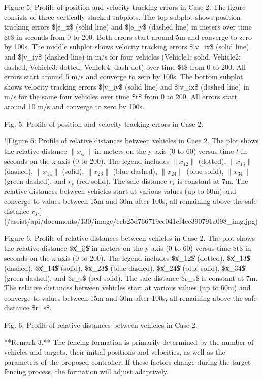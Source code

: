 Figure 5: Profile of position and velocity tracking errors in Case 2. The figure consists of three vertically stacked subplots. The top subplot shows position tracking errors \$\bar{e}\_x\$ (solid line) and \$\bar{e}\_y\$ (dashed line) in meters over time \$t\$ in seconds from 0 to 200. Both errors start around 5m and converge to zero by 100s. The middle subplot shows velocity tracking errors \$\bar{v}\_{ix}\$ (solid line) and \$\bar{v}\_{iy}\$ (dashed line) in m/s for four vehicles (Vehicle1: solid, Vehicle2: dashed, Vehicle3: dotted, Vehicle4: dash-dot) over time \$t\$ from 0 to 200. All errors start around 5 m/s and converge to zero by 100s. The bottom subplot shows velocity tracking errors \$\bar{v}\_{iy}\$ (solid line) and \$\bar{v}\_{ix}\$ (dashed line) in m/s for the same four vehicles over time \$t\$ from 0 to 200. All errors start around 10 m/s and converge to zero by 100s.

Fig. 5. Profile of position and velocity tracking errors in Case 2.

![Figure 6: Profile of relative distances between vehicles in Case 2. The plot shows the relative distance $\|x_{ij}\|$ in meters on the y-axis (0 to 60) versus time $t$ in seconds on the x-axis (0 to 200). The legend includes $\|x_{12}\|$ (dotted), $\|x_{13}\|$ (dashed), $\|x_{14}\|$ (solid), $\|x_{23}\|$ (blue dashed), $\|x_{24}\|$ (blue solid), $\|x_{34}\|$ (green dashed), and $r_s$ (red solid). The safe distance $r_s$ is constant at 7m. The relative distances between vehicles start at various values (up to 60m) and converge to values between 15m and 30m after 100s, all remaining above the safe distance $r_s$.](/assist/api/documents/130/image/ecb25d766719ce041cf4cc390791a098_img.jpg)

Figure 6: Profile of relative distances between vehicles in Case 2. The plot shows the relative distance \$\|x\_{ij}\|\$ in meters on the y-axis (0 to 60) versus time \$t\$ in seconds on the x-axis (0 to 200). The legend includes \$\|x\_{12}\|\$ (dotted), \$\|x\_{13}\|\$ (dashed), \$\|x\_{14}\|\$ (solid), \$\|x\_{23}\|\$ (blue dashed), \$\|x\_{24}\|\$ (blue solid), \$\|x\_{34}\|\$ (green dashed), and \$r\_s\$ (red solid). The safe distance \$r\_s\$ is constant at 7m. The relative distances between vehicles start at various values (up to 60m) and converge to values between 15m and 30m after 100s, all remaining above the safe distance \$r\_s\$.

Fig. 6. Profile of relative distances between vehicles in Case 2.

**Remark 3.** The fencing formation is primarily determined by the number of vehicles and targets, their initial positions and velocities, as well as the parameters of the proposed controller. If these factors change during the target-fencing process, the formation will adjust adaptively.

